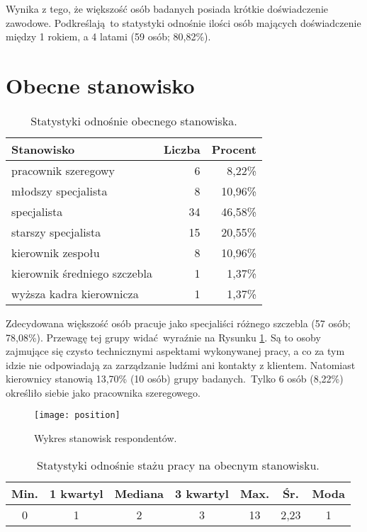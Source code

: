 Wynika z tego, że większość osób badanych posiada krótkie doświadczenie zawodowe. Podkreślają to statystyki odnośnie ilości osób mających doświadczenie między 1 rokiem, a 4 latami (59 osób; 80,82\%).

\section{Obecne stanowisko}

\begin{table}[h!]
\begin{center}
\begin{tabular}{l r r}
Stanowisko & Liczba & Procent \\ \hline
pracownik szeregowy & 6 & 8,22\% \\
młodszy specjalista & 8 & 10,96\% \\
specjalista & 34 & 46,58\% \\
starszy specjalista & 15 & 20,55\% \\
kierownik zespołu & 8 & 10,96\% \\
kierownik średniego szczebla & 1 & 1,37\% \\
wyższa kadra kierownicza & 1 & 1,37\% \\
\end{tabular}
\end{center}
\caption{Statystyki odnośnie obecnego stanowiska.}
\label{tab:position-stats}
\end{table}

Zdecydowana większość osób pracuje jako specjaliści różnego szczebla (57 osób; 78,08\%). Przewagę tej grupy widać wyraźnie na Rysunku \ref{fig:position}. Są to osoby zajmujące się czysto technicznymi aspektami wykonywanej pracy, a co za tym idzie nie odpowiadają za zarządzanie ludźmi ani kontakty z klientem. Natomiast kierownicy stanowią 13,70\% (10 osób) grupy badanych. Tylko 6 osób (8,22\%) określiło siebie jako pracownika szeregowego.

\begin{figure}[h]
\begin{center}
\texttt{[image: position]}
\end{center}
\caption{Wykres stanowisk respondentów.}
\label{fig:position}
\end{figure}

\begin{table}[h!]
\begin{center}
\begin{tabular}{c c c c c c c}
Min. & 1 kwartyl & Mediana & 3 kwartyl & Max. & Śr. & Moda \\ \hline
0 & 1 & 2 & 3 & 13 & 2,23 & 1 \\
\end{tabular}
\end{center}
\caption{Statystyki odnośnie stażu pracy na obecnym stanowisku.}
\label{tab:position-years-stats}
\end{table}

